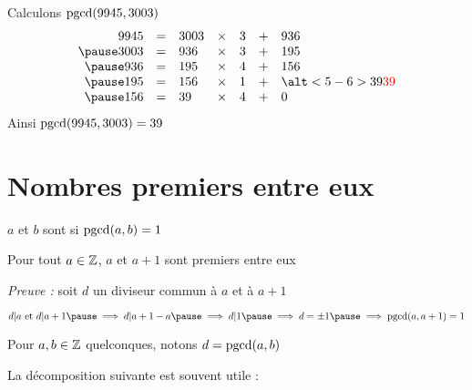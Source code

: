 \begin{frame}

\begin{exemple}
Calculons $\mathop{\text{pgcd}}\nolimits(9945,3003)$
\pause
$$
\begin{array}{rclclcl}
9945 & = & 3003 & \times & 3 & + & 936 \\ 
\pause
3003 & = & 936  & \times & 3 & + & 195 \\
\pause
936  & = & 195  & \times & 4 & + & 156 \\
\pause
195  & = & 156  & \times & 1 & + & \alt<5-6>{39}{\textcolor{red}{39}} \\
\pause
156  & = & 39   & \times & 4 & + & 0 \\
\end{array}
$$
\pause\pause
Ainsi $\mathop{\text{pgcd}}\nolimits(9945,3003) = 39$
\end{exemple}
\end{frame}

\section{Nombres premiers entre eux}

\begin{frame}
\begin{mydefinition}
$a$ et $b$ sont  si $\mathop{\text{pgcd}}\nolimits(a,b)=1$ 
\end{mydefinition}

\pause

\begin{exemple}
Pour tout $a\in \mathbb{Z}$, $a$ et $a+1$ sont premiers entre eux

\pause 
{\footnotesize
\emph{Preuve :} soit $d$ un diviseur commun à $a$ et à $a+1$

\pause

$d|a \text{ et } d|a+1 \pause\implies d| a+1-a \pause\implies d| 1 \pause\implies d=\pm1 \pause\implies \pgcd(a,a+1)=1$
}
\end{exemple}

\pause

\begin{exemple}
Pour $a,b \in \mathbb{Z}$ quelconques, notons $d = \mathop{\text{pgcd}}\nolimits(a,b)$

La décomposition suivante est souvent utile :
\end{exemple}


\end{frame}



